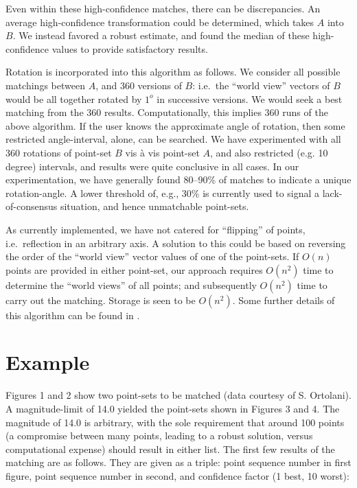 Even within these high-confidence matches, there can be discrepancies.
An average high-confidence transformation could be determined, which takes 
$A$ into $B$.
We instead favored a robust estimate, and found the median of these
high-confidence values to provide satisfactory results.

Rotation is incorporated into this algorithm as follows.
We consider all possible
matchings between $A$, and 360 versions of $B$: 
i.e.\ the ``world view'' vectors
of $B$ would be all together rotated by $1^o$ in successive versions.  We 
would seek a best matching from the 360 results.
Computationally, this implies 360 runs of the above algorithm.  If the
user knows the approximate angle of rotation, then some restricted 
angle-interval, alone, can be searched.  We have experimented with all 360
rotations of point-set $B$ vis \`a vis point-set $A$, and also restricted
(e.g. 10 degree) intervals, and results were quite conclusive in all 
cases.  In our experimentation, we have generally found 80--90\% of matches to 
indicate a unique rotation-angle.  A lower threshold of, e.g., 30\% is 
currently used to signal a lack-of-consensus situation, and hence unmatchable 
point-sets.

As currently implemented, we have not catered for ``flipping'' of points,
i.e.\ reflection in an arbitrary axis.  A solution to this could be based
on reversing the order of the ``world view'' vector values of one of the 
point-sets. 
If $O(n)$ points are provided in either point-set, our approach 
requires $O(n^2)$ time to determine the ``world views'' of
all points; and subsequently $O(n^2)$ time to carry out the matching.  
Storage is seen to be $O(n^2)$.  
Some further details of this algorithm can be found in \cite{mur2}.

\section{Example}
Figures 
1 and 2 show two point-sets to be matched (data courtesy of S. Ortolani).
A magnitude-limit of 14.0 yielded the point-sets shown in Figures 3 and 4.
The magnitude of 14.0 is arbitrary, with the sole requirement that around
100 points (a compromise between many points, leading to a robust solution,
versus computational expense) should result in either list.
The first few results of the matching are as follows.  They are given as a
triple: point sequence number in first figure, point sequence number in 
second, and confidence factor (1 best, 10 worst):

